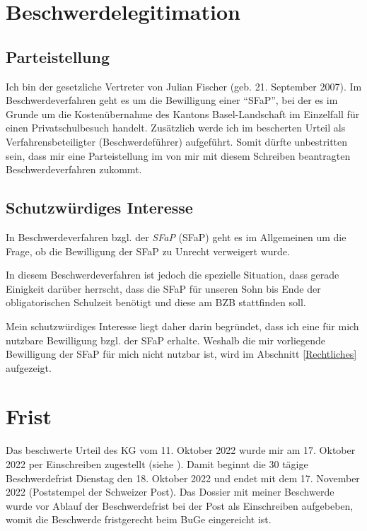 \documentclass[paper=a4, onesite]{scrreprt}
\newcounter{rz}
\newcommand{\Rz}{\addtocounter{rz}{1}\marginpar{\texttt{(\textit{\arabic{rz}})}}}
\begin{document}
\section{Beschwerdelegitimation}

\subsection{Parteistellung}
\Rz Ich bin der gesetzliche Vertreter von Julian Fischer (geb. 21. September 2007). Im Beschwerdeverfahren geht es um die Bewilligung einer "`\acl{SFaP}"', bei der es im Grunde um die Kostenübernahme des Kantons Basel-Landschaft im Einzelfall für einen Privatschulbesuch handelt. Zusätzlich werde ich  im bescherten Urteil \cite{KGE81022211} als Verfahrensbeteiligter (Beschwerdeführer) aufgeführt. Somit dürfte unbestritten sein, dass mir eine Parteistellung im von mir mit diesem Schreiben beantragten Beschwerdeverfahren zukommt.

\subsection{Schutzwürdiges Interesse}
\Rz In Beschwerdeverfahren bzgl. der \textit{\acl{SFaP}} (\ac{SFaP}) geht es im Allgemeinen um die Frage, ob die Bewilligung der \ac{SFaP} zu Unrecht verweigert wurde.\\ 

\Rz In diesem Beschwerdeverfahren ist jedoch die spezielle Situation, dass gerade Einigkeit darüber herrscht, dass die \ac{SFaP} für unseren Sohn bis Ende der obligatorischen Schulzeit benötigt und diese am \ac{BZB} stattfinden soll.\\


\Rz Mein schutzwürdiges Interesse liegt daher darin begründet, dass ich eine für mich nutzbare Bewilligung bzgl. der \ac{SFaP} erhalte. Weshalb die mir vorliegende Bewilligung der \ac{SFaP} für mich nicht nutzbar ist, wird im Abschnitt \ref{Rechtliches} aufgezeigt.



\section{Frist}
\Rz Das beschwerte Urteil des \acl{KG} vom 11. Oktober 2022 wurde mir am 17. Oktober 2022 per Einschreiben zugestellt (siehe  \cite{CouvertKG}). Damit beginnt die 30 tägige Beschwerdefrist Dienstag den 18. Oktober 2022 und endet mit dem 17. November 2022 (Poststempel der Schweizer Post). Das Dossier mit meiner Beschwerde wurde vor Ablauf der Beschwerdefrist bei der Post als Einschreiben aufgebeben, womit die Beschwerde fristgerecht beim \ac{BuGe} eingereicht ist.
\end{document}
